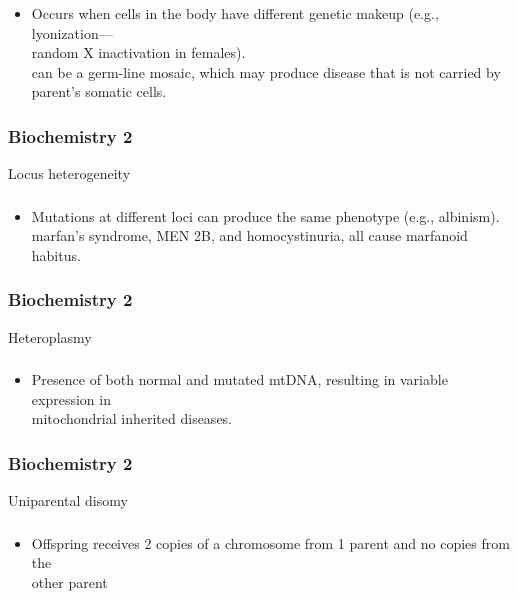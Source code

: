 \documentclass[11pt]{beamer}
\begin{document}
\begin{frame}
 \frametitle{}
\begin{itemize}
\item Occurs when cells in the body have different genetic makeup (e.g., lyonization–– \\ random X inactivation in females). \\ can be a germ-line mosaic, which may produce disease that is not carried by parent's somatic cells. 
\end{itemize}
\end{frame}

\begin{frame}
 \frametitle{Biochemistry 2}
Locus heterogeneity
\end{frame}

\begin{frame}
 \frametitle{}
\begin{itemize}
\item Mutations at different loci can produce the same phenotype (e.g., albinism). \\ marfan's syndrome, MEN 2B, and homocystinuria, all cause marfanoid habitus. 
\end{itemize}
\end{frame}

\begin{frame}
 \frametitle{Biochemistry 2}
Heteroplasmy
\end{frame}

\begin{frame}
 \frametitle{}
\begin{itemize}
\item Presence of both normal and mutated mtDNA, resulting in variable expression in \\ mitochondrial inherited diseases.
\end{itemize}
\end{frame}

\begin{frame}
 \frametitle{Biochemistry 2}
Uniparental disomy
\end{frame}

\begin{frame}
 \frametitle{}
\begin{itemize}
\item Offspring receives 2 copies of a chromosome from 1 parent and no copies from the \\ other parent
\end{itemize}
\end{frame}
\end{document}
